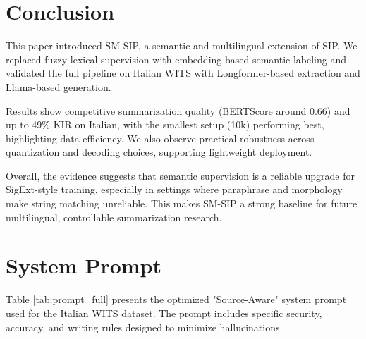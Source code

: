 \documentclass[conference]{IEEEtran}
\begin{document}
\section{Conclusion}
This paper introduced SM-SIP, a semantic and multilingual extension of SIP. We replaced fuzzy lexical supervision with embedding-based semantic labeling and validated the full pipeline on Italian WITS with Longformer-based extraction and Llama-based generation.

Results show competitive summarization quality (BERTScore around 0.66) and up to 49\% KIR on Italian, with the smallest setup (10k) performing best, highlighting data efficiency. We also observe practical robustness across quantization and decoding choices, supporting lightweight deployment.

Overall, the evidence suggests that semantic supervision is a reliable upgrade for SigExt-style training, especially in settings where paraphrase and morphology make string matching unreliable. This makes SM-SIP a strong baseline for future multilingual, controllable summarization research.

\appendices

\section{System Prompt}
Table \ref{tab:prompt_full} presents the optimized "Source-Aware" system prompt used for the Italian WITS dataset. The prompt includes specific security, accuracy, and writing rules designed to minimize hallucinations.
\end{document}
